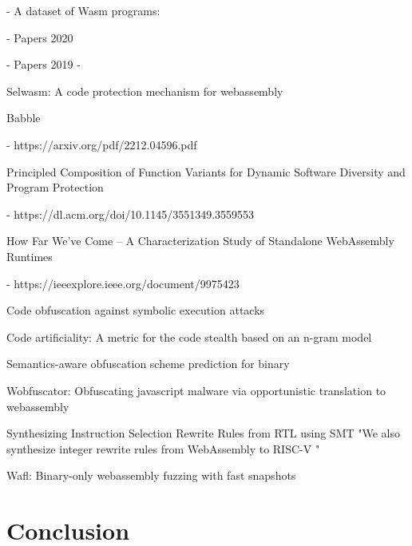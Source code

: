 \documentclass[sigplan,screen]{acmart}
\begin{document}
- A dataset of Wasm programs: \cite{nicholson2023wasmizer}

- Papers 2020

- Papers 2019
- \cite{10.1145/3510003.3510070}

Selwasm: A code protection mechanism for webassembly


Babble

- https://arxiv.org/pdf/2212.04596.pdf

Principled Composition of Function Variants for Dynamic
Software Diversity and Program Protection

- https://dl.acm.org/doi/10.1145/3551349.3559553

How Far We’ve Come – A Characterization Study of Standalone WebAssembly Runtimes

- https://ieeexplore.ieee.org/document/9975423

Code obfuscation against symbolic execution attacks

Code artificiality: A metric for the code stealth based on an n-gram model

Semantics-aware obfuscation scheme prediction for binary

Wobfuscator: Obfuscating javascript malware via opportunistic translation to webassembly

Synthesizing Instruction Selection Rewrite Rules from RTL using SMT
"We also synthesize integer rewrite rules from WebAssembly to RISC-V "

Wafl: Binary-only webassembly fuzzing with fast snapshots


\section{Conclusion}





\end{document}
